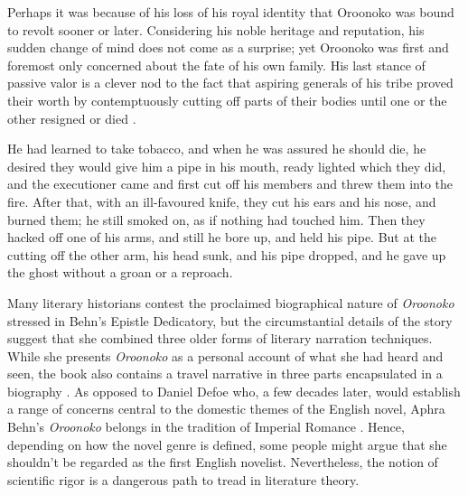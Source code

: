Perhaps it was because of his loss of his royal identity that Oroonoko was bound 
to revolt sooner or later. Considering his noble heritage and reputation, his 
sudden change of mind does not come as a surprise; yet Oroonoko was first and 
foremost only concerned about the fate of his own family. His last stance of 
passive valor is a clever nod to the fact that aspiring generals of his tribe 
proved their worth by contemptuously cutting off parts of their bodies until one 
or the other resigned or died \autocite[86]{behn2003}.

\begin{displayquote}
He had learned to take tobacco, and when he was assured he should die, he 
desired they would give him a pipe in his mouth, ready lighted which they did, 
and the executioner came and first cut off his members and threw them into the 
fire. After that, with an ill-favoured knife, they cut his ears and his nose, 
and burned them; he still smoked on, as if nothing had touched him. Then they 
hacked off one of his arms, and still he bore up, and held his pipe. But at the 
cutting off the other arm, his head sunk, and his pipe dropped, and he gave up 
the ghost without a groan or a reproach. \autocite[111]{behn2003}    
\end{displayquote}

Many literary historians contest the proclaimed biographical nature of 
\emph{Oroonoko} stressed in Behn’s Epistle Dedicatory, but the circumstantial 
details of the story suggest that she combined three older forms of literary 
narration techniques. While she presents \emph{Oroonoko} as a personal account 
of what she had heard and seen, the book also contains a travel narrative in 
three parts encapsulated in a biography \autocite[2179]{greenblatt2006}. As 
opposed to Daniel Defoe who, a few decades later, would establish a range of 
concerns central to the domestic themes of the English novel, Aphra Behn’s 
\emph{Oroonoko} belongs in the tradition of Imperial Romance 
\autocite[139]{peckCoyle2002}. Hence, depending on how the novel genre is 
defined, some people might argue that she shouldn’t be regarded as the first 
English novelist. Nevertheless, the notion of scientific rigor is a dangerous 
path to tread in literature theory.
